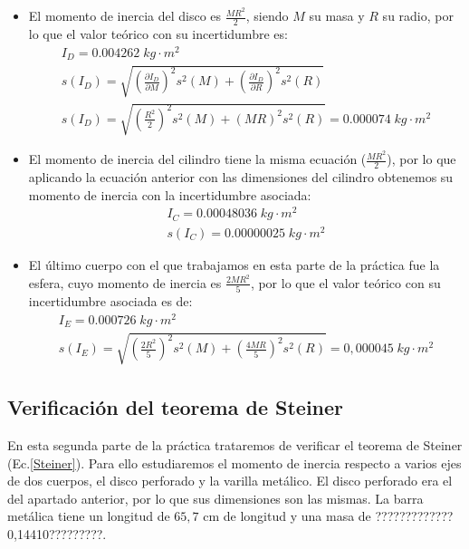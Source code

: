 \documentclass[a4paper,12pt,titlepage]{article}
\begin{document}
\begin{itemize}
    \item El momento de inercia del disco es $\frac{MR^2}{2}$, siendo $M$ su masa y $R$ su radio, por lo que el valor teórico con su incertidumbre es:
    \begin{equation}
        \begin{gathered}
            I_D = 0.004262 \; kg \cdot m^2\\
            s(I_D) = \sqrt{\left (\frac{\partial I_D}{\partial M}\right )^2s^2(M) + \left (\frac{\partial I_D}{\partial R}\right )^2s^2(R)} \\ s(I_D)= \sqrt{\left (\frac{R^2}{2}\right )^2s^2(M) + (MR)^2s^2(R)} = 0.000074 \;kg\cdot m^2
        \end{gathered}
    \end{equation}
    \item El momento de inercia del cilindro tiene la misma ecuación ($\frac{MR^2}{2}$), por lo que aplicando la ecuación anterior con las dimensiones del cilindro obtenemos su momento de inercia con la incertidumbre asociada:
    \begin{equation}
        \begin{gathered}
            I_C = 0.00048036 \; kg \cdot m^2\\
            s(I_C) = 0.00000025 \; kg \cdot m^2
        \end{gathered}
    \end{equation}
    \item El último cuerpo con el que trabajamos en esta parte de la práctica fue la esfera, cuyo momento de inercia es $\frac{2MR^2}{5}$, por lo que el valor teórico con su incertidumbre asociada es de:
    \begin{equation}
        \begin{gathered}
            I_E = 0.000726 \; kg \cdot m^2 \\
            s(I_E) = \sqrt{\left (\frac{2R^2}{5}\right )^2s^2(M) + \left (\frac{4MR}{5}\right )^2s^2(R)} = 0,000045 \; kg\cdot m^2
        \end{gathered}
    \end{equation}
\end{itemize}

\subsection{Verificación del teorema de Steiner}

En esta segunda parte de la práctica trataremos de verificar el teorema de Steiner (Ec.\ref{Steiner}). Para ello estudiaremos el momento de inercia respecto a varios ejes de dos cuerpos, el disco perforado y la varilla metálico. El disco perforado era el del apartado anterior, por lo que sus dimensiones son las mismas. La barra metálica tiene un longitud de $65,7$ cm de longitud y una masa de ?????????????0,14410?????????.
\end{document}
